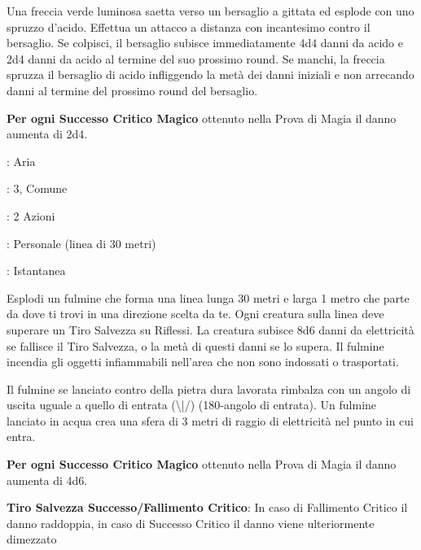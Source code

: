 \begin{multicols}{2}
Una freccia verde luminosa saetta verso un bersaglio a gittata ed esplode con uno spruzzo d'acido. Effettua un attacco a distanza con incantesimo contro il bersaglio. Se colpisci, il bersaglio subisce immediatamente 4d4 danni da acido e 2d4 danni da acido al termine del suo prossimo round. Se manchi, la freccia spruzza il bersaglio di acido infliggendo la metà dei danni iniziali e non arrecando danni al termine del prossimo round del bersaglio.

\textbf{Per ogni Successo Critico Magico} ottenuto nella Prova di Magia il danno aumenta di 2d4.

\noindent\colorbox{OBSSgold!10}{
\begin{minipage}{0.95\linewidth}
\begin{description}[noitemsep, topsep=0pt, parsep=0pt, partopsep=0pt, leftmargin=0cm, labelwidth=1.3cm]
	\item[\textbf{Lista}]: Aria
	\item[\textbf{Livello}]: 3, Comune
	\item[\textbf{Lancio}]: 2 Azioni
	\item[\textbf{Gittata}]: Personale (linea di 30 metri)
	\item[\textbf{Durata}]: Istantanea
\end{description}
\end{minipage}}\smallskip

Esplodi un fulmine che forma una linea lunga 30 metri e larga 1 metro che parte da dove ti trovi in una direzione scelta da te. Ogni creatura sulla linea deve superare un Tiro Salvezza su Riflessi. La creatura subisce 8d6 danni da elettricità se fallisce il Tiro Salvezza, o la metà di questi danni se lo supera.
Il fulmine incendia gli oggetti infiammabili nell'area che non sono indossati o trasportati.

Il fulmine se lanciato contro della pietra dura lavorata rimbalza con un angolo di uscita uguale a quello di entrata (\textbackslash|/) (180-angolo di entrata). Un fulmine lanciato in acqua crea una sfera di 3 metri di raggio di elettricità nel punto in cui entra.

\textbf{Per ogni Successo Critico Magico} ottenuto nella Prova di Magia il danno aumenta di 4d6.

\textbf{Tiro Salvezza Successo/Fallimento Critico}: In caso di Fallimento Critico il danno raddoppia, in caso di Successo Critico il danno viene ulteriormente dimezzato


\end{multicols}
